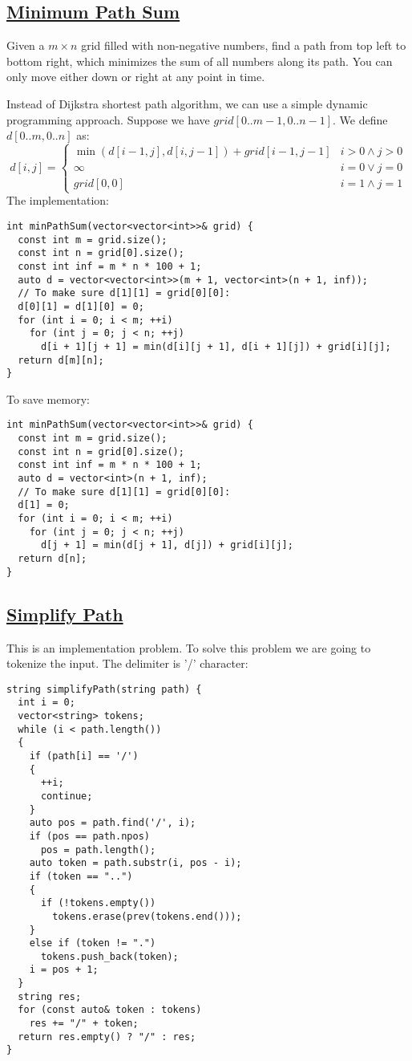 \documentclass{book}
\begin{document}
	\subsection{\href{https://leetcode.com/problems/minimum-path-sum/}{Minimum Path Sum}}
	Given a $m \times n$ grid filled with non-negative numbers, find a path from top left to bottom right, which minimizes the sum of all numbers along its path. You can only move either down or right at any point in time.
	\par Instead of Dijkstra shortest path algorithm, we can use a simple dynamic programming approach. Suppose we have $grid[0..m -1, 0..n - 1]$. We define $d[0..m, 0..n]$ as:
	\begin{equation*}
		d[i, j] = \begin{cases}
			\min(d[i - 1, j], d[i, j - 1]) + grid[i - 1, j - 1] & i > 0 \land j > 0 \\
			\infty & i = 0 \lor j = 0 \\
			grid[0, 0] & i = 1 \land j = 1
		\end{cases}
	\end{equation*}
	The implementation:
	\begin{lstlisting}
int minPathSum(vector<vector<int>>& grid) {
  const int m = grid.size();
  const int n = grid[0].size();
  const int inf = m * n * 100 + 1;
  auto d = vector<vector<int>>(m + 1, vector<int>(n + 1, inf));
  // To make sure d[1][1] = grid[0][0]:
  d[0][1] = d[1][0] = 0;
  for (int i = 0; i < m; ++i)
    for (int j = 0; j < n; ++j)
      d[i + 1][j + 1] = min(d[i][j + 1], d[i + 1][j]) + grid[i][j];
  return d[m][n];
}
	\end{lstlisting}
	To save memory:
	\begin{lstlisting}
int minPathSum(vector<vector<int>>& grid) {
  const int m = grid.size();
  const int n = grid[0].size();
  const int inf = m * n * 100 + 1;
  auto d = vector<int>(n + 1, inf);
  // To make sure d[1][1] = grid[0][0]:
  d[1] = 0;
  for (int i = 0; i < m; ++i)
    for (int j = 0; j < n; ++j)
      d[j + 1] = min(d[j + 1], d[j]) + grid[i][j];
  return d[n];
}
	\end{lstlisting}
	\subsection{\href{https://leetcode.com/problems/simplify-path/}{Simplify Path}}
	This is an implementation problem. To solve this problem we are going to tokenize the input. The delimiter is '/' character:
	\begin{lstlisting}
string simplifyPath(string path) {
  int i = 0;
  vector<string> tokens;
  while (i < path.length())
  {
    if (path[i] == '/')
    {
      ++i;
      continue;
    }
    auto pos = path.find('/', i);
    if (pos == path.npos)
      pos = path.length();
    auto token = path.substr(i, pos - i);
    if (token == "..")
    {
      if (!tokens.empty())
        tokens.erase(prev(tokens.end()));
    }
    else if (token != ".")
      tokens.push_back(token);
    i = pos + 1;
  }
  string res;
  for (const auto& token : tokens)
    res += "/" + token;
  return res.empty() ? "/" : res;
}
	\end{lstlisting}
\end{document}
